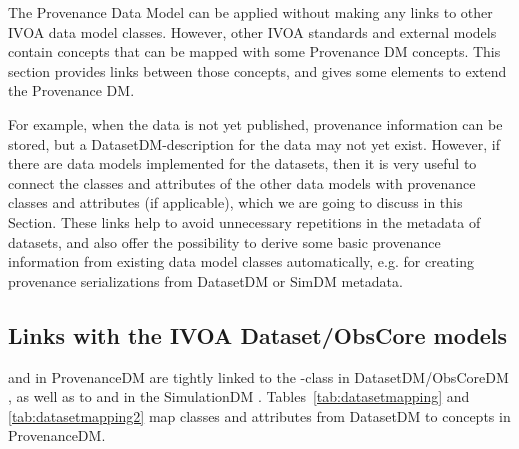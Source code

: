 
The Provenance Data Model can be applied without making any links to other 
IVOA data model classes. 
However, other IVOA standards and external models contain concepts that can be mapped with some Provenance DM concepts. This section provides links between those concepts, and gives some elements to extend the Provenance DM.

For example, when the data is not yet published, provenance information
can be stored, but a DatasetDM-description for the data may not yet exist.
However, if there are data models implemented for the datasets, then it is 
very useful to connect the classes and attributes of the other data models with provenance classes and attributes (if applicable), which we are going to discuss in this Section. These links help to avoid 
unnecessary repetitions in the metadata of datasets, and also offer the possibility 
to derive some basic provenance information from existing data model classes automatically, e.g. for creating provenance serializations from DatasetDM or SimDM metadata.



\subsection{Links with the IVOA Dataset/ObsCore models}
\label{sec:dataset-obscore}

 and  in ProvenanceDM 
are tightly linked to the -class in DatasetDM/ObsCoreDM \citep{std:DatasetDM, std:OBSCORE}, as well as to 
 and  in the SimulationDM \citep{2012ivoa.spec.0503L}.
Tables~\ref{tab:datasetmapping} and \ref{tab:datasetmapping2} map classes and attributes from DatasetDM
to concepts in ProvenanceDM. 




